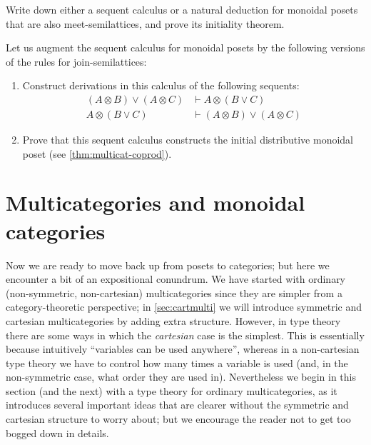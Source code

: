 \documentclass{book}
\let\types\vdash
\def\type{\;\ftype}
\let\join\vee
\let\tensor\otimes
\begin{document}
\begin{ex}\label{ex:monpos-mslat}
  Write down either a sequent calculus or a natural deduction for monoidal posets that are also meet-semilattices, and prove its initiality theorem.
\end{ex}

\begin{ex}\label{ex:monpos-jslat}
  Let us augment the sequent calculus for monoidal posets by the following versions of the rules for join-semilattices:
  \begin{enumerate}
  \item Construct derivations in this calculus of the following sequents:
    \begin{align*}
      (A\tensor B)\join (A\tensor C) &\types  A\tensor (B\join C)\\
      A\tensor (B\join C) &\types (A\tensor B)\join (A\tensor C)
    \end{align*}
  \item Prove that this sequent calculus constructs the initial distributive monoidal poset (see \cref{thm:multicat-coprod}).
  \end{enumerate}
\end{ex}


\section{Multicategories and monoidal categories}
\label{sec:multicat-moncat}

Now we are ready to move back up from posets to categories; but here we encounter a bit of an expositional conundrum.
We have started with ordinary (non-symmetric, non-cartesian) multicategories since they are simpler from a category-theoretic perspective; in \cref{sec:cartmulti} we will introduce symmetric and cartesian multicategories by adding extra structure.
However, in type theory there are some ways in which the \emph{cartesian} case is the simplest.
This is essentially because intuitively ``variables can be used anywhere'', whereas in a non-cartesian type theory we have to control how many times a variable is used (and, in the non-symmetric case, what order they are used in).
Nevertheless we begin in this section (and the next) with a type theory for ordinary multicategories, as it introduces several important ideas that are clearer without the symmetric and cartesian structure to worry about; but we encourage the reader not to get too bogged down in details.
\end{document}
